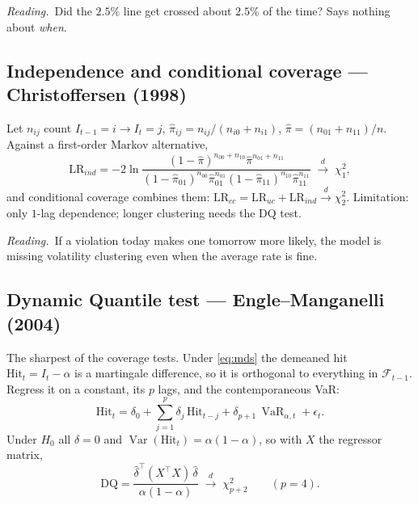 \documentclass[11pt,a4paper]{article}
\newcommand{\Var}{\operatorname{Var}}
\newcommand{\VaR}{\operatorname{VaR}}
\newcommand{\Fcal}{\mathcal{F}}
\newcommand{\dto}{\xrightarrow{d}}
\newcommand{\intuition}[1]{\par\smallskip\noindent\textit{Reading.}\ #1\par\smallskip}
\begin{document}
\intuition{Did the $2.5\%$ line get crossed about $2.5\%$ of the time? Says
nothing about \emph{when}.}

\subsection{Independence and conditional coverage --- Christoffersen (1998)}

Let $n_{ij}$ count $I_{t-1}=i\to I_t=j$, $\hat\pi_{ij}=n_{ij}/(n_{i0}+n_{i1})$,
$\hat\pi=(n_{01}+n_{11})/n$. Against a first-order Markov alternative,
\begin{equation}
  \mathrm{LR}_{ind}
  = -2\ln\frac{(1-\hat\pi)^{n_{00}+n_{10}}\hat\pi^{n_{01}+n_{11}}}
              {(1-\hat\pi_{01})^{n_{00}}\hat\pi_{01}^{n_{01}}
               (1-\hat\pi_{11})^{n_{10}}\hat\pi_{11}^{n_{11}}}
  \;\dto\;\chi^2_1,
\end{equation}
and conditional coverage combines them:
$\mathrm{LR}_{cc}=\mathrm{LR}_{uc}+\mathrm{LR}_{ind}\dto\chi^2_2$. Limitation:
only $1$-lag dependence; longer clustering needs the DQ test.

\intuition{If a violation today makes one tomorrow more likely, the model is
missing volatility clustering even when the average rate is fine.}

\subsection{Dynamic Quantile test --- Engle--Manganelli (2004)}

The sharpest of the coverage tests. Under \eqref{eq:mds} the demeaned hit
$\mathrm{Hit}_t = I_t - \alpha$ is a martingale difference, so it is orthogonal
to everything in $\Fcal_{t-1}$. Regress it on a constant, its $p$ lags, and the
contemporaneous VaR:
\begin{equation}
  \mathrm{Hit}_t = \delta_0 + \sum_{j=1}^{p}\delta_j\,\mathrm{Hit}_{t-j}
                 + \delta_{p+1}\,\VaR_{\alpha,t} + \epsilon_t .
\end{equation}
Under $H_0$ all $\delta = 0$ and $\Var(\mathrm{Hit}_t)=\alpha(1-\alpha)$, so with
$X$ the regressor matrix,
\begin{equation}
  \mathrm{DQ} = \frac{\hat\delta^{\top}(X^{\top}X)\,\hat\delta}{\alpha(1-\alpha)}
  \;\dto\;\chi^2_{p+2}
  \qquad (p = 4).
\end{equation}
\end{document}
